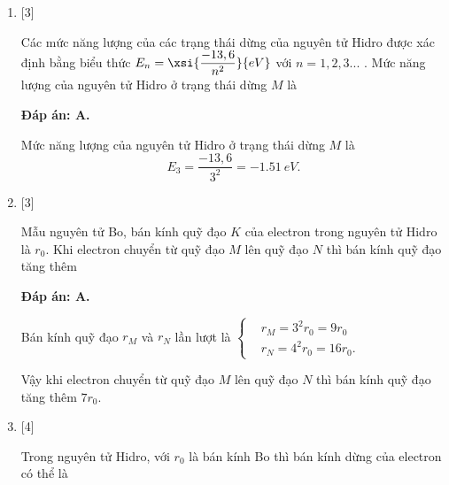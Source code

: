 \begin{enumerate}[label=\bfseries Câu \arabic*:]
	\item {} [3]
		\cauhoi
	{Các mức năng lượng của các trạng thái dừng của nguyên tử Hidro được xác định bằng biểu thức $ E_{n} = \xsi{\dfrac{-13,6}{n^{2}}}{eV} $ với $ n = 1,2,3... $ . Mức năng lượng của nguyên tử Hidro ở trạng thái dừng $ M $ là
	}
	
	\loigiai
	{		\textbf{Đáp án: A.}
		
		Mức năng lượng của nguyên tử Hidro ở trạng thái dừng $ M $ là
		$$
		E_{3} = \dfrac{-13,6}{3^{2}} = \SI{-1,51}{eV}.
		$$
	}
	
	\item {} [3]
		\cauhoi
	{Mẫu nguyên tử Bo, bán kính quỹ đạo $ K $ của electron trong nguyên tử Hidro là $ r_{0} $. Khi electron chuyển từ quỹ đạo $ M $ lên quỹ đạo $ N $ thì bán kính quỹ đạo tăng thêm
	}
	
	\loigiai
	{		\textbf{Đáp án: A.}
		
		Bán kính quỹ đạo $ r_{M} $ và $ r_{N} $ lần lượt là
		$
		\left\{
		\begin{aligned}
			& r_{M} = 3^{2} r_{0} = 9 r_{0} \\
			& r_{N} = 4^{2} r_{0} = 16 r_{0}.
		\end{aligned}
		\right.
		$
		
		Vậy khi electron chuyển từ quỹ đạo $ M $ lên quỹ đạo $ N $ thì bán kính quỹ đạo tăng thêm $ 7 r_{0} $.
	}
	
	\item {} [4]
	\cauhoi
	{Trong nguyên tử Hidro, với $ r_{0} $ là bán kính Bo thì bán kính dừng của electron có thể là
	}
	

\end{enumerate}
